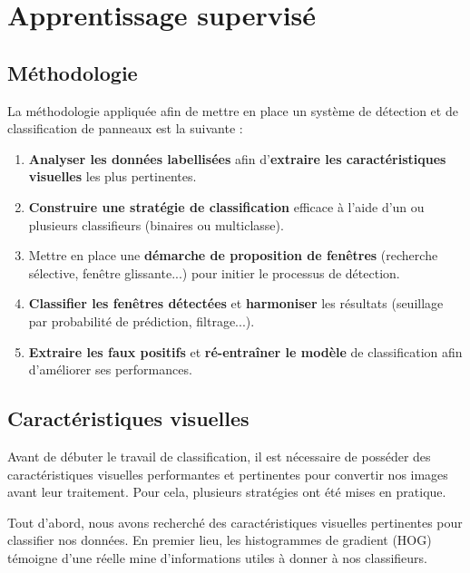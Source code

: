 \documentclass[a4paper,11pt]{article}
\begin{document}
\section{Apprentissage supervisé}

\subsection{Méthodologie}

La méthodologie appliquée afin de mettre en place un système de détection et de classification de panneaux est la suivante :

\begin{enumerate}[label=\arabic*.]
    \item \textbf{Analyser les données labellisées} afin d'\textbf{extraire les caractéristiques visuelles} les plus pertinentes.
    \item \textbf{Construire une stratégie de classification} efficace à l'aide d'un ou plusieurs classifieurs (binaires ou multiclasse).
    \item Mettre en place une \textbf{démarche de proposition de fenêtres} (recherche sélective, fenêtre glissante...) pour initier le processus de détection.
    \item \textbf{Classifier les fenêtres détectées} et \textbf{harmoniser} les résultats (seuillage par probabilité de prédiction, filtrage...).
    \item \textbf{Extraire les faux positifs} et \textbf{ré-entraîner le modèle} de classification afin d'améliorer ses performances.
\end{enumerate}

\subsection{Caractéristiques visuelles}

Avant de débuter le travail de classification, il est nécessaire de posséder des caractéristiques visuelles performantes et pertinentes pour convertir nos images avant leur traitement. Pour cela, plusieurs stratégies ont été mises en pratique. 

\vspace{2mm}

Tout d'abord, nous avons recherché des caractéristiques visuelles pertinentes pour classifier nos données. En premier lieu, les histogrammes de gradient (HOG) témoigne d'une réelle mine d'informations utiles à donner à nos classifieurs.
\end{document}
